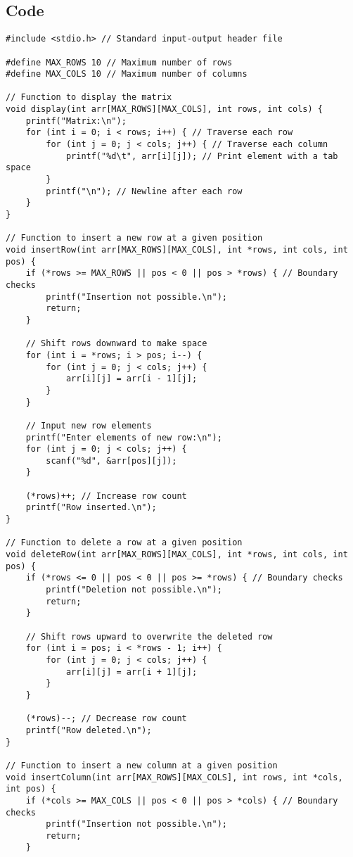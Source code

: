 \documentclass[12pt,a4paper]{article}
\begin{document}
\subsection*{Code}
\begin{lstlisting}
#include <stdio.h> // Standard input-output header file

#define MAX_ROWS 10 // Maximum number of rows
#define MAX_COLS 10 // Maximum number of columns

// Function to display the matrix
void display(int arr[MAX_ROWS][MAX_COLS], int rows, int cols) {
    printf("Matrix:\n");
    for (int i = 0; i < rows; i++) { // Traverse each row
        for (int j = 0; j < cols; j++) { // Traverse each column
            printf("%d\t", arr[i][j]); // Print element with a tab space
        }
        printf("\n"); // Newline after each row
    }
}

// Function to insert a new row at a given position
void insertRow(int arr[MAX_ROWS][MAX_COLS], int *rows, int cols, int pos) {
    if (*rows >= MAX_ROWS || pos < 0 || pos > *rows) { // Boundary checks
        printf("Insertion not possible.\n");
        return;
    }

    // Shift rows downward to make space
    for (int i = *rows; i > pos; i--) {
        for (int j = 0; j < cols; j++) {
            arr[i][j] = arr[i - 1][j];
        }
    }

    // Input new row elements
    printf("Enter elements of new row:\n");
    for (int j = 0; j < cols; j++) {
        scanf("%d", &arr[pos][j]);
    }

    (*rows)++; // Increase row count
    printf("Row inserted.\n");
}

// Function to delete a row at a given position
void deleteRow(int arr[MAX_ROWS][MAX_COLS], int *rows, int cols, int pos) {
    if (*rows <= 0 || pos < 0 || pos >= *rows) { // Boundary checks
        printf("Deletion not possible.\n");
        return;
    }

    // Shift rows upward to overwrite the deleted row
    for (int i = pos; i < *rows - 1; i++) {
        for (int j = 0; j < cols; j++) {
            arr[i][j] = arr[i + 1][j];
        }
    }

    (*rows)--; // Decrease row count
    printf("Row deleted.\n");
}

// Function to insert a new column at a given position
void insertColumn(int arr[MAX_ROWS][MAX_COLS], int rows, int *cols, int pos) {
    if (*cols >= MAX_COLS || pos < 0 || pos > *cols) { // Boundary checks
        printf("Insertion not possible.\n");
        return;
    }


\end{lstlisting}
\end{document}
